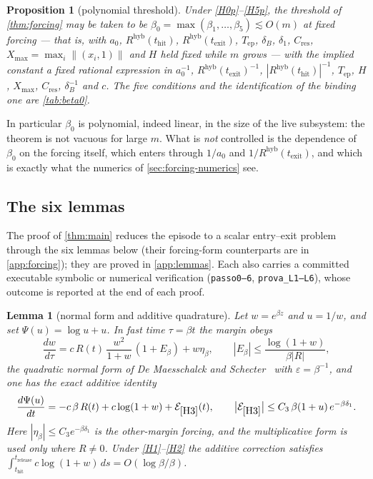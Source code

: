 \documentclass[11pt]{article}
\newtheorem{lemma}[lemma]{Lemma}
\newtheorem{proposition}[proposition]{Proposition}
\theoremstyle{definition}
\theoremstyle{remark}
\newcommand{\thit}{t_{\mathrm{hit}}}
\newcommand{\texit}{t_{\mathrm{exit}}}
\newcommand{\trel}{t_{\mathrm{release}}}
\newcommand{\Tep}{T_{\mathrm{ep}}}   %
\newcommand{\hyb}{\mathrm{hyb}}
\begin{document}
\begin{proposition}[polynomial threshold]\label{prop:beta0}
Under \textup{\eqref{H0p}--\eqref{H5p}}, the threshold of \cref{thm:forcing} may be
taken to be $\beta_0=\max(\beta_1,\dots,\beta_5)\lesssim O(m)$ at fixed forcing
--- that is, with $a_0$, $R^{\hyb}(\thit)$, $R^{\hyb}(\texit)$, $\Tep$,
$\delta_B$, $\delta_1$, $C_{\mathrm{res}}$, $X_{\max}=\max_i\|(x_i,1)\|$ and $H$
held fixed while $m$ grows --- with the implied constant a fixed rational expression in
$a_0^{-1}$, $R^{\hyb}(\texit)^{-1}$, $|R^{\hyb}(\thit)|^{-1}$, $\Tep$, $H$,
$X_{\max}$, $C_{\mathrm{res}}$, $\delta_B^{-1}$ and $c$. The five conditions and
the identification of the binding one are \cref{tab:beta0}.
\end{proposition}

In particular $\beta_0$ is polynomial, indeed linear, in the size of the live
subsystem: the theorem is not vacuous for large $m$. What is \emph{not}
controlled is the dependence of $\beta_0$ on the forcing itself, which enters
through $1/a_0$ and $1/R^{\hyb}(\texit)$, and which is exactly what the numerics
of \cref{sec:forcing-numerics} see.

\subsection{The six lemmas}\label{sec:lemmas}

The proof of \cref{thm:main} reduces the episode to a scalar entry--exit problem
through the six lemmas below (their forcing-form counterparts are in
\cref{app:forcing}); they are proved in \cref{app:lemmas}. Each also carries a committed executable symbolic or
numerical verification (\texttt{passo0--6}, \texttt{prova\_L1--L6}), whose
outcome is reported at the end of each proof.

\begin{lemma}[normal form and additive quadrature]\label{lem:gauge}
Let $w=e^{\beta z}$ and $u=1/w$, and set $\Psi(u)=\log u+u$. In fast time
$\tau=\beta t$ the margin obeys
\begin{equation}\label{eq:normalform}
\frac{dw}{d\tau}=c\,R(t)\,\frac{w^{2}}{1+w}\,(1+E_\beta)+w\eta_\beta,
\qquad
|E_\beta|\le\frac{\log(1+w)}{\beta|R|},
\end{equation}
the quadratic normal form of De Maesschalck and
Schecter~\cite[equations~(1.9)--(1.10)]{DMS16} with $\varepsilon=\beta^{-1}$,
and one has the exact additive
identity
\begin{equation}\label{eq:quadrature}
\frac{d\Psi(u)}{dt}=-c\,\beta\,R(t)+c\log(1+w)+\mathcal{E}_{\eqref{H3}}(t),
\qquad
\bigl|\mathcal{E}_{\eqref{H3}}\bigr|\le C_3\,\beta(1+u)\,e^{-\beta\delta_1}.
\end{equation}
Here $|\eta_\beta|\le C_3e^{-\beta\delta_1}$ is the other-margin
forcing, and the multiplicative form is used only where $R\ne0$.
Under \eqref{H1}--\eqref{H2} the additive correction satisfies
$\int_{\thit}^{\trel}c\log(1+w)\,ds=O(\log\beta/\beta)$.
\end{lemma}
\end{document}
